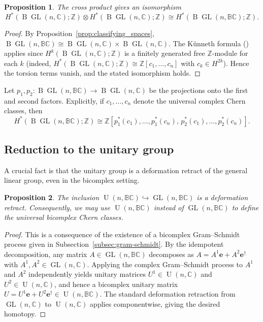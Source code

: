 \documentclass[11pt]{amsart}
\newcommand{\BC}{\mathbb{BC}}       %
\newcommand{\C}{\mathbb{C}}          %
\newcommand{\Z}{\mathbb{Z}}
\newcommand{\B}{\operatorname{B}}
\newcommand{\e}{\mathbf{e}}          %
\newcommand{\ed}{\mathbf{e}^\dagger} %
\newcommand{\GL}{\operatorname{GL}}  %
\newcommand{\U}{\operatorname{U}}    %
\newtheorem{prop}{Proposition}[section]   %
\theoremstyle{definition}
\begin{document}
\begin{prop}\label{prop:cohomology_classifying}
    The cross product gives an isomorphism
    \begin{equation*}
        H^*(\B\!\GL(n,\C);\Z) \otimes H^*(\B\!\GL(n,\C);\Z)
        \cong H^*(\B\!\GL(n,\BC);\Z).
    \end{equation*}
\end{prop}

\begin{proof}
    By Proposition~\ref{prop:classifying_spaces}, $\B\!\GL(n,\BC) \cong \B\!\GL(n,\C) \times \B\!\GL(n,\C)$. The Künneth formula (\cite[Theorem~3.18]{hatcher}) applies since $H^k(\B\!\GL(n,\C);\Z)$ is a finitely generated free $\Z$-module for each $k$ (indeed, $H^*(\B\!\GL(n,\C);\Z) \cong \Z[c_1,\dots,c_n]$ with $c_k \in H^{2k}$). Hence the torsion terms vanish, and the stated isomorphism holds.
\end{proof}

Let $p_1, p_2: \B\!\GL(n,\BC) \to \B\!\GL(n,\C)$ be the projections onto the first and second factors. Explicitly, if $c_1,\dots,c_n$ denote the universal complex Chern classes, then
\begin{equation}
    H^*(\B\!\GL(n,\BC);\Z)
    \cong \Z[p_1^*(c_1), \dots, p_1^*(c_n), \, p_2^*(c_1), \dots, p_2^*(c_n)].
\end{equation}

\subsection{Reduction to the unitary group}

A crucial fact is that the unitary group is a deformation retract of the general linear group, even in the bicomplex setting.

\begin{prop}\label{prop:deformation_retract}
    The inclusion $\U(n,\BC) \hookrightarrow \GL(n,\BC)$ is a deformation retract. Consequently, we may use $\U(n,\BC)$ instead of $\GL(n,\BC)$ to define the universal bicomplex Chern classes.
\end{prop}

\begin{proof}
    This is a consequence of the existence of a bicomplex Gram--Schmidt process given in Subsection~\ref{subsec:gram-schmidt}. By the idempotent decomposition, any matrix $A \in \GL(n,\BC)$ decomposes as $A = A^1\e + A^2\ed$ with $A^1, A^2 \in \GL(n,\C)$. Applying the complex Gram--Schmidt process to $A^1$ and $A^2$ independently yields unitary matrices $U^1 \in \U(n,\C)$ and $U^2 \in \U(n,\C)$, and hence a bicomplex unitary matrix $U = U^1\e + U^2\ed \in \U(n,\BC)$. The standard deformation retraction from $\GL(n,\C)$ to $\U(n,\C)$ applies componentwise, giving the desired homotopy.
\end{proof}
\end{document}
